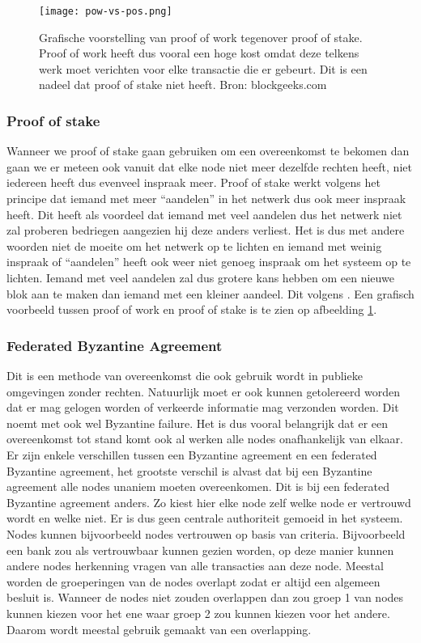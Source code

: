 \begin{figure}
	\texttt{[image: pow-vs-pos.png]}
	\caption{Grafische voorstelling van proof of work tegenover proof of stake. Proof of work heeft dus vooral een hoge kost omdat deze telkens werk moet verichten voor elke transactie die er gebeurt. Dit is een nadeel dat proof of stake niet heeft.  Bron: blockgeeks.com}
	\label{fig:pow-vs-pos}
\end{figure}

\subsubsection{Proof of stake}
Wanneer we proof of stake gaan gebruiken om een overeenkomst te bekomen dan gaan we er meteen ook vanuit dat elke node niet meer dezelfde rechten heeft, niet iedereen heeft dus evenveel inspraak meer. Proof of stake werkt volgens het principe dat iemand met meer ``aandelen'' in het netwerk dus ook meer inspraak heeft. Dit heeft als voordeel dat iemand met veel aandelen dus het netwerk niet zal proberen bedriegen aangezien hij deze anders verliest. Het is dus met andere woorden niet de moeite om het netwerk op te lichten en iemand met weinig inspraak of ``aandelen'' heeft ook weer niet genoeg inspraak om het systeem op te lichten. Iemand met veel aandelen zal dus grotere kans hebben om een nieuwe blok aan te maken dan iemand met een kleiner aandeel. Dit volgens \textcite{Buterin2013}. Een grafisch voorbeeld tussen proof of work en proof of stake is te zien op afbeelding \ref{fig:pow-vs-pos}.

\subsubsection{Federated Byzantine Agreement}
Dit is een methode van overeenkomst die ook gebruik wordt in publieke omgevingen zonder rechten. Natuurlijk moet er ook kunnen getolereerd worden dat er mag gelogen worden of verkeerde informatie mag verzonden worden. Dit noemt met ook wel Byzantine failure. Het is dus vooral belangrijk dat er een overeenkomst tot stand komt ook al werken alle nodes onafhankelijk van elkaar. Er zijn enkele verschillen tussen een Byzantine agreement en een federated Byzantine agreement, het grootste verschil is alvast dat bij een Byzantine agreement alle nodes unaniem moeten overeenkomen. Dit is bij een federated Byzantine agreement anders. Zo kiest hier elke node zelf welke node er vertrouwd wordt en welke niet. Er is dus geen centrale authoriteit gemoeid in het systeem. Nodes kunnen bijvoorbeeld nodes vertrouwen op basis van criteria. Bijvoorbeeld een bank zou als vertrouwbaar kunnen gezien worden, op deze manier kunnen andere nodes herkenning vragen van alle transacties aan deze node. Meestal worden de groeperingen van de nodes overlapt zodat er altijd een algemeen besluit is. Wanneer de nodes niet zouden overlappen dan zou groep 1 van nodes kunnen kiezen voor het ene waar groep 2 zou kunnen kiezen voor het andere. Daarom wordt meestal gebruik gemaakt van een overlapping.

